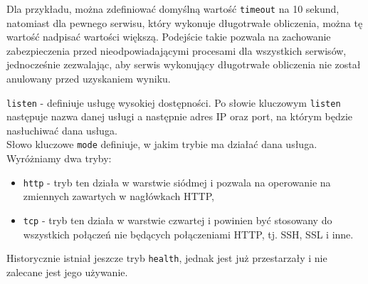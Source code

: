 {\begin{description}
		Dla przykładu, można zdefiniować domyślną wartość \texttt{timeout} na 10 sekund, natomiast dla pewnego serwisu, który wykonuje długotrwałe obliczenia, można tę wartość nadpisać wartości większą.
		Podejście takie pozwala na zachowanie zabezpieczenia przed nieodpowiadającymi procesami dla wszystkich serwisów, jednocześnie zezwalając, aby serwis wykonujący długotrwałe obliczenia nie został anulowany przed uzyskaniem wyniku.
	\item{\texttt{listen}} - 
		definiuje usługę wysokiej dostępności. Po słowie kluczowym \texttt{listen} następuje nazwa danej usługi a następnie adres IP oraz port, na którym będzie nasłuchiwać dana usługa.\\
		Słowo kluczowe \texttt{mode} definiuje, w jakim trybie ma działać dana usługa.
		Wyróżniamy dwa tryby:
		\begin{itemize}
			\item \texttt{http} - 
				tryb ten działa w warstwie siódmej i pozwala na operowanie na zmiennych zawartych w nagłówkach HTTP,
			\item \texttt{tcp} - 
				tryb ten działa w warstwie czwartej i powinien być stosowany do wszystkich połączeń nie będących połączeniami HTTP, tj. SSH, SSL i inne.
		\end{itemize}
		Historycznie istniał jeszcze tryb \texttt{health}, jednak jest już przestarzały i nie zalecane jest jego używanie.\\
		

\end{description}}
